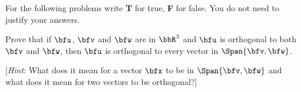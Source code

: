 \begin{questions}
  \question For the following problems write \textbf{T} for true,
  \textbf{F} for false. You do not need to justify your answers.

  \bigskip\bigskip
  \bigskip\bigskip
  \bigskip\bigskip
  \bigskip\bigskip
  \question[8] Prove that if $\bfu$, $\bfv$ and $\bfw$ are in $\bbR^3$ and
  $\bfu$ is orthogonal to both $\bfv$ and $\bfw$, then $\bfu$ is orthogonal
  to every vector in $\Span\{\bfv,\bfw\}$.

  [\emph{Hint}: What does it mean for a vector $\bfx$ to be in
  $\Span\{\bfv,\bfw\}$ and what does it mean for two vectors to be
  orthogonal?]
\end{questions}


